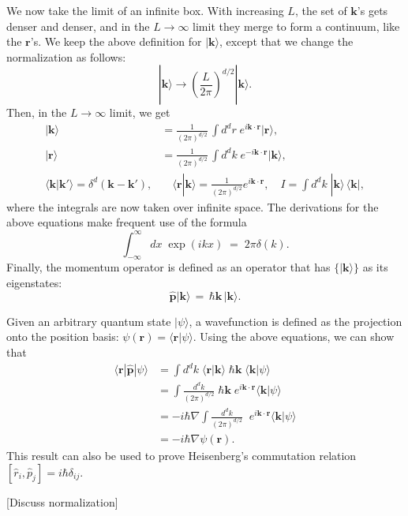 \documentclass[pra,11pt]{revtex4}
\begin{document}
We now take the limit of an infinite box.  With increasing $L$, the
set of $\mathbf{k}$'s gets denser and denser, and in the $L
\rightarrow \infty$ limit they merge to form a continuum, like the
$\mathbf{r}$'s.  We keep the above definition for
$|\mathbf{k}\rangle$, except that we change the normalization as
follows:
$$|\mathbf{k}\rangle \rightarrow \left(\frac{L}{2\pi}\right)^{d/2} |\mathbf{k}\rangle.$$
Then, in the $L\rightarrow\infty$ limit, we get
$$\boxed{\begin{aligned} |\mathbf{k}\rangle &= \frac{1}{(2\pi)^{d/2}} \, \int d^dr \; e^{i\mathbf{k}\cdot\mathbf{r}} |\mathbf{r}\rangle, \\ |\mathbf{r}\rangle &= \frac{1}{(2\pi)^{d/2}} \, \int d^dk \; e^{-i\mathbf{k}\cdot\mathbf{r}} |\mathbf{k}\rangle, \\\langle\mathbf{k}|\mathbf{k}'\rangle = \delta^d(\mathbf{k}-\mathbf{k}'),& \quad \langle\mathbf{r}|\mathbf{k}\rangle = \frac{1}{(2\pi)^{d/2}} e^{i\mathbf{k}\cdot\mathbf{r}}, \quad I = \int d^dk \;|\mathbf{k}\rangle\,\langle\mathbf{k}|,\end{aligned}}$$
where the integrals are now taken over infinite space.  The
derivations for the above equations make frequent use of the formula
$$\int_{-\infty}^\infty dx\; \exp(ikx) \;=\; 2\pi\delta(k).$$
Finally, the momentum operator is defined as an operator that has
$\{|\mathbf{k}\rangle\}$ as its eigenstates:
$$\hat{\mathbf{p}} |\mathbf{k}\rangle \,=\, \hbar \mathbf{k}\, |\mathbf{k}\rangle.$$

Given an arbitrary quantum state $|\psi\rangle$, a wavefunction is
defined as the projection onto the position basis: $\psi(\mathbf{r}) =
\langle \mathbf{r}|\psi\rangle$.  Using the above equations, we can
show that
$$\begin{aligned}\langle \mathbf{r}|\hat{\mathbf{p}}|\psi\rangle &=  \int d^dk \; \langle\mathbf{r}|\mathbf{k}\rangle \; \hbar\mathbf{k} \; \langle\mathbf{k}|\psi\rangle \\ &=  \int \frac{d^dk}{(2\pi)^{d/2}}\; \hbar\mathbf{k} \;e^{i\mathbf{k}\cdot\mathbf{r}} \langle\mathbf{k}|\psi\rangle \\ &=  -i\hbar\nabla \int \frac{d^dk}{(2\pi)^{d/2}}\; \;e^{i\mathbf{k}\cdot\mathbf{r}} \langle\mathbf{k}|\psi\rangle \\ &= -i\hbar \nabla\psi(\mathbf{r}).\end{aligned}$$
This result can also be used to prove Heisenberg's commutation relation
$[\hat{r}_i, \hat{p}_j] = i\hbar\delta_{ij}$.

[Discuss normalization]
\end{document}
